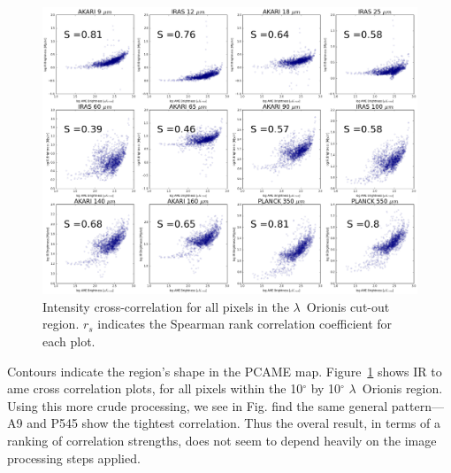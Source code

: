           \begin{figure}
            \includegraphics[width=\textwidth]{../Plots/orionis_correlations_AME.png}
            \centering
            \caption{Intensity cross-correlation for all pixels in the $\lambda$~Orionis cut-out region.  $r_{s}$ indicates the Spearman rank correlation coefficient for each plot.}
            \label{fig:orionis-corr}
          \end{figure}
        Contours indicate the region's shape in the PCAME map. Figure~\ref{fig:orionis-corr} shows IR to \acrshort{ame} cross correlation plots, for all pixels within the 10$^{\circ}$ by 10$^{\circ}$ $\lambda$~Orionis region. Using this more crude processing, we see in Fig. find the same general pattern--- A9 and P545 show the tightest correlation. Thus the overal result, in terms of a ranking of correlation strengths, does not seem to depend heavily on the image processing steps applied.

